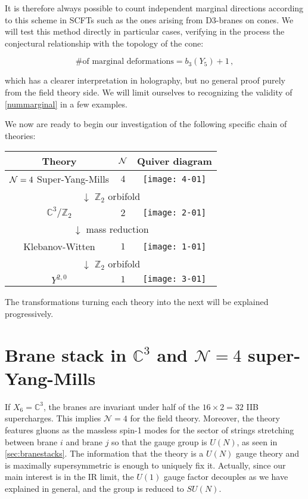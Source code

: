 It is therefore always possible to count independent marginal directions according to this scheme in SCFTs such as the ones arising from D3-branes on cones. We will test this method directly in particular cases, verifying in the process the conjectural relationship with the topology of the cone:

\begin{equation}
	\text{\# of marginal deformations} = b_3(Y_5) + 1\,,
	\label{nummarginal}
\end{equation}

which has a clearer interpretation in holography, but no general proof purely from the field theory side. We will limit ourselves to recognizing the validity of \eqref{nummarginal} in a few examples.

We now are ready to begin our investigation of the following specific chain of theories:

\begin{center}
\begin{tabular}{|c | c | c|}
	\hline
	Theory & $\mathcal{N}$ & Quiver diagram  \\
	\hline \hline
	$\mathcal{N} = 4$ Super-Yang-Mills & $4$ & \texttt{[image: 4-01]}\\ \hline 
	\multicolumn{3}{c}{ $\downarrow$ $\mathbb{Z}_2$ orbifold} \\ \hline
	$\mathbb{C}^3/\mathbb{Z}_2$ & $2$ & \texttt{[image: 2-01]} \\ \hline
	\multicolumn{3}{c}{ $\downarrow$ mass reduction} \\ \hline
	Klebanov-Witten & $1$ & \texttt{[image: 1-01]}\\ \hline
	\multicolumn{3}{c}{ $\downarrow$ $\mathbb{Z}_2$ orbifold} \\ \hline
	$Y^{2,0}$ & $1$ & \texttt{[image: 3-01]}\\ \hline
\end{tabular}
\end{center}

The transformations turning each theory into the next will be explained progressively.

\section{Brane stack in $\mathbb{C}^3$ and $\mathcal{N}=4$ super-Yang-Mills} \label{SYM4}

If $X_6 = \mathbb{C}^3$, the branes are invariant under half of the $16 \times 2 = 32$ IIB supercharges. This implies $\mathcal{N}=4$ for the field theory. Moreover, the theory features gluons as the massless spin-1 modes for the sector of strings stretching between brane $i$ and brane $j$ so that the gauge group is $U(N)$, as seen in \ref{sec:branestacks}. The information that the theory is a $U(N)$ gauge theory and is maximally supersymmetric is enough to uniquely fix it. Actually, since our main interest is in the IR limit, the $U(1)$ gauge factor decouples as we have explained in general, and the group is reduced to $SU(N)$.

